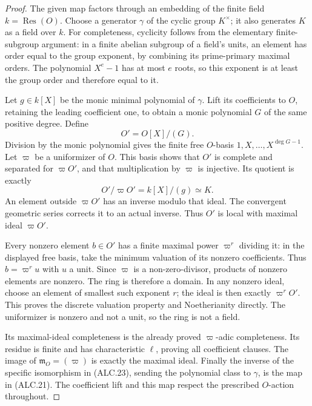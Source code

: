 \documentclass[11pt,a4paper]{article}
\numberwithin{equation}{section}
\theoremstyle{remark}\newtheorem{remark}[theorem]{Remark}
\begin{document}
\begin{proof}
The given map factors through an embedding of the finite
field \(k=\operatorname{Res}(O)\).  Choose a generator
\(\gamma\) of the cyclic group \(K^\times\); it also
generates \(K\) as a field over \(k\).  For completeness,
cyclicity follows from the elementary finite-subgroup argument:
in a finite abelian subgroup of a field's units, an element
has order equal to the group exponent, by combining its
prime-primary maximal orders.  The polynomial \(X^e-1\)
has at most \(e\) roots, so this exponent is at least the
group order and therefore equal to it.

Let \(g\in k[X]\) be the monic minimal polynomial of
\(\gamma\).  Lift its coefficients to \(O\), retaining
the leading coefficient one, to obtain a monic polynomial
\(G\) of the same positive degree.  Define
\[
                    O'=O[X]/(G).
                                                        \tag{ALC.22}
\]
Division by the monic polynomial gives the finite free
\(O\)-basis \(1,X,\ldots,X^{\deg G-1}\).  Let
\(\varpi\) be a uniformizer of \(O\).  This basis shows
that \(O'\) is complete and separated for \(\varpi O'\),
and that multiplication by \(\varpi\) is injective.  Its
quotient is exactly
\[
          O'/\varpi O'=k[X]/(g)\simeq K.
                                                        \tag{ALC.23}
\]
An element outside \(\varpi O'\) has an inverse modulo
that ideal.  The convergent geometric series corrects it
to an actual inverse.  Thus \(O'\) is local with maximal
ideal \(\varpi O'\).

Every nonzero element \(b\in O'\) has a finite maximal
power \(\varpi^r\) dividing it: in the displayed free
basis, take the minimum valuation of its nonzero
coefficients.  Thus \(b=\varpi^r u\) with \(u\) a
unit.  Since \(\varpi\) is a non-zero-divisor, products
of nonzero elements are nonzero.  The ring is therefore
a domain.  In any nonzero ideal, choose an element of
smallest such exponent \(r\); the ideal is then exactly
\(\varpi^rO'\).  This proves the discrete valuation
property and Noetherianity directly.  The uniformizer is
nonzero and not a unit, so the ring is not a field.

Its maximal-ideal completeness is the already proved
\(\varpi\)-adic completeness.  Its residue is finite and
has characteristic \(\ell\), proving all coefficient
clauses.  The image of \(\mathfrak m_O=(\varpi)\) is
exactly the maximal ideal.  Finally the inverse of the
specific isomorphism in (ALC.23), sending the polynomial
class to \(\gamma\), is the map in (ALC.21).  The
coefficient lift and this map respect the prescribed
\(O\)-action throughout.
\end{proof}
\end{document}
